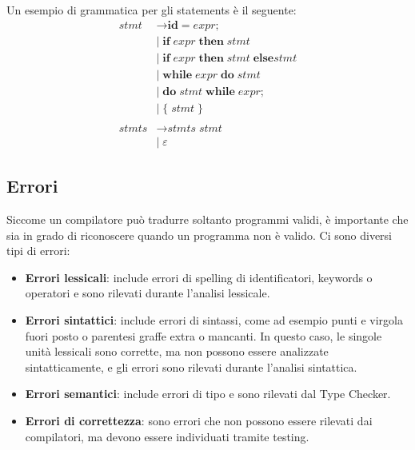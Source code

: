 \documentclass[a4paper]{article}
\begin{document}
\begin{example}
  Un esempio di grammatica per gli statements è il seguente:
  \[
    \begin{aligned}
      \textit{stmt} &\to \textbf{id} \; \textbf{=} \; \textit{expr} \textbf{;} \\
                    &\mid\; \textbf{if} \; \textit{expr}\; \textbf{then}\; \textit{stmt} \\
                    &\mid\; \textbf{if}\; \textit{expr}\; \textbf{then}\; \textit{stmt}\; \textbf{else} \textit{stmt} \\
                    &\mid\; \textbf{while}\; \textit{expr}\; \textbf{do}\; \textit{stmt} \\
                    &\mid\; \textbf{do}\; \textit{stmt}\; \textbf{while}\; \textit{expr} \textbf{;} \\
                    &\mid\; \textbf{\{}\; \textit{stmt}\; \textbf{\}} \\
                    \\
      \textit{stmts} &\to \textit{stmts} \; \textit{stmt} \\
                     &\mid\; \varepsilon
    \end{aligned}
  \] 
\end{example}

\subsection{Errori}
Siccome un compilatore può tradurre soltanto programmi validi, è importante che
sia in grado di riconoscere quando un programma non è valido. Ci sono diversi
tipi di errori:
\begin{itemize}
  \item \textbf{Errori lessicali}: include errori di spelling di identificatori,
    keywords o operatori e sono rilevati durante l'analisi lessicale.

  \item \textbf{Errori sintattici}: include errori di sintassi, come ad esempio
    punti e virgola fuori posto o parentesi graffe extra o mancanti. In questo
    caso, le singole unità lessicali sono corrette, ma non possono essere
    analizzate sintatticamente, e gli errori sono rilevati durante
    l'analisi sintattica.

  \item \textbf{Errori semantici}: include errori di tipo e sono rilevati dal
    Type Checker.

  \item \textbf{Errori di correttezza}: sono errori che non possono essere rilevati
    dai compilatori, ma devono essere individuati tramite testing.
\end{itemize}
\end{document}
